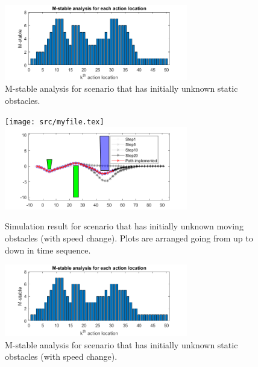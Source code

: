 \documentclass{ifacconf}
\begin{document}
\begin{figure}[htbp]
\begin{center}
\includegraphics[width=8cm]{src/3_2_1_M-stable.png}
\caption{M-stable analysis for scenario that has initially unknown static obstacles. }
\label{fig: mpc}
\end{center}
\end{figure}


 


\begin{figure}[htbp]
\begin{center}
\texttt{[image: src/myfile.tex]}
\includegraphics[width=8cm]{src/3_2_4.png}
\caption{Simulation result for scenario that has initially unknown moving obstacles (with speed change). Plots are arranged going from up to down in time sequence.}
\label{fig: mpc}
\end{center}
\end{figure}

\begin{figure}[htbp]
\begin{center}
\includegraphics[width=8cm]{src/3_2_M-stable.png}
\caption{M-stable analysis for scenario that has initially unknown static obstacles (with speed change). }
\label{fig: mpc}
\end{center}
\end{figure}
\end{document}
